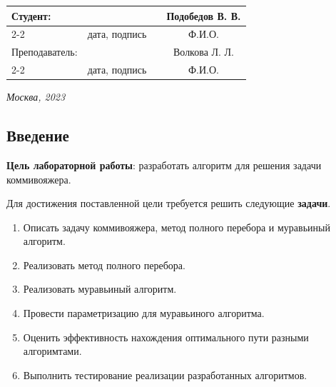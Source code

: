 \documentclass[12pt, a4paper]{article}
\begin{document}
\begin{titlepage}
  \fontsize{14}{21}\selectfont
  \vspace{5cm}


  \noindent\begin{tabularx}{\textwidth}{ X >{\centering}p{4cm} p{1cm} c }
   Студент: & & & Подобедов В. В. \\ \cline{2-2} \cline{4-4}
   & \fontsize{10}{15}\selectfont дата, подпись & & \fontsize{10}{15}\selectfont Ф.И.О. \\
   Преподаватель: & & & Волкова Л. Л.\\ \cline{2-2} \cline{4-4}
   & \fontsize{10}{15}\selectfont дата, подпись & & \fontsize{10}{15}\selectfont Ф.И.О.
  \end{tabularx}

  \vspace{\fill}

  \begin{center}
   \it{Москва}, 2023
  \end{center}

  \thispagestyle{empty}
\end{titlepage}

\renewcommand{\contentsname}{Содержание}
\setcounter{page}{2}
\tableofcontents

\newpage
\begin{center}
   \section*{Введение} 
\end{center}

\textbf{Цель лабораторной работы}: разработать алгоритм для решения задачи коммивояжера.

Для достижения поставленной цели требуется решить следующие \textbf{задачи}.
\begin{enumerate}
\item Описать задачу коммивояжера, метод полного перебора и муравьиный алгоритм. 
\item Реализовать метод полного перебора.
\item Реализовать муравьиный алгоритм.
\item Провести параметризацию для муравьиного алгоритма.
\item Оценить эффективность нахождения оптимального пути разными алгоримтами.
\item Выполнить тестирование реализации разработанных алгоритмов.
\end{enumerate}
\end{document}
